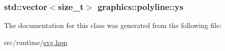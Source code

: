 \subsubsection[{\texorpdfstring{ys}{ys}}]{\setlength{\rightskip}{0pt plus 5cm}std\+::vector$<$size\+\_\+t$>$ graphics\+::polyline\+::ys\hspace{0.3cm}{\ttfamily [private]}}\hypertarget{classgraphics_1_1polyline_a864909f189748ca967b33068d1a5d8e0}{}\label{classgraphics_1_1polyline_a864909f189748ca967b33068d1a5d8e0}


The documentation for this class was generated from the following file\+:\begin{DoxyCompactItemize}
\item 
src/runtime/\hyperlink{svg_8hpp}{svg.\+hpp}\end{DoxyCompactItemize}
